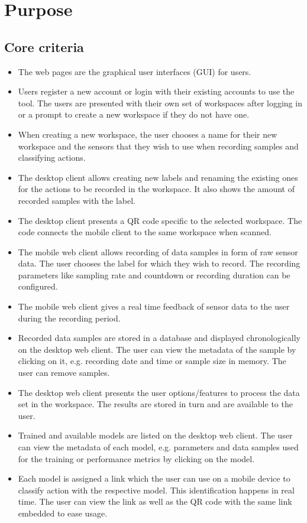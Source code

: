 \section{Purpose}

\subsection{Core criteria}
\begin{itemize}
    \item The web pages are the graphical user interfaces (GUI) for users.
    \item Users register a new account or login with their existing accounts to use the tool. The users are presented with their own set of workspaces after logging in or a prompt to create a new workspace if they do not have one.
    \item When creating a new workspace, the user chooses a name for their new workspace and the sensors that they wish to use when recording samples and classifying actions. %
    \item The desktop client allows creating new labels and renaming the existing ones for the actions to be recorded in the workspace. It also shows the amount of recorded samples with the label. 
    \item The desktop client presents a QR code specific to the selected workspace. The code connects the mobile client to the same \gls{workspace} when scanned.
    \item The mobile web client allows recording of data samples in form of raw sensor data. The user chooses the label for which they wish to record. The recording parameters like sampling rate and countdown or recording duration can be configured.
    \item The mobile web client gives a real time feedback of sensor data to the user during the recording period.
    \item Recorded data samples are stored in a database and displayed chronologically on the desktop web client. The user can view the metadata of the sample by clicking on it, e.g. recording date and time or sample size in memory. The user can remove samples.
    \item The desktop web client presents the user options/features to process the data set in the workspace. The results are stored in turn and are available to the user. %
    \item Trained and available models are listed on the desktop web client. The user can view the metadata of each model, e.g. parameters and data samples used for the training or performance metrics by clicking on the model.
    \item Each model is assigned a link which the user can use on a mobile device to classify action with the respective model. This identification happens in real time. The user can view the link as well as the QR code with the same link embedded to ease usage.
\end{itemize}

